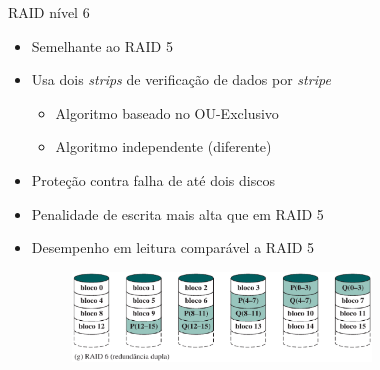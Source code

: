 \begin{slide}{RAID nível 6}
	\begin{itemize}
		\item Semelhante ao RAID 5
		\item Usa dois \emph{strips} de verificação de dados por \emph{stripe}
			\begin{itemize}
				\item Algoritmo baseado no OU-Exclusivo
				\item Algoritmo independente (diferente)
			\end{itemize}
		\item Proteção contra falha de até dois discos
		\item Penalidade de escrita mais alta que em RAID 5
		\item Desempenho em leitura comparável a RAID 5
			\begin{figure}[h]
				\centering
				\includegraphics[width=0.75\textwidth]{figs/raid6}
			\end{figure}
	\end{itemize}
\end{slide}

